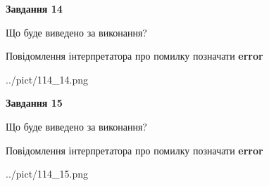 \documentclass[11pt, ukrainian]{article}
\begin{document}
{\begin {large}
{\begin {center}\textbf{Завдання 14}\end {center}}\par
Що буде виведено за виконання? \par
Повідомлення інтерпретатора про помилку позначати \textbf{error}

\begin{center}
	{../pict/114_14.png}
\end{center}
\newpage

{\begin {center}\textbf{Завдання 15}\end {center}}\par
Що буде виведено за виконання? \par
Повідомлення інтерпретатора про помилку позначати \textbf{error}

\begin{center}
	{../pict/114_15.png}
\end{center}
\newpage

\end {large}}
\end{document}
